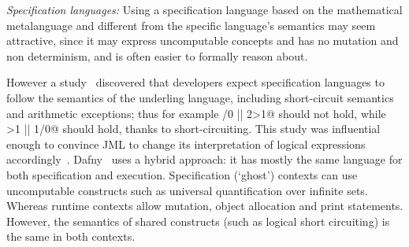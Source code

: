 


\textit{Specification languages:}
Using a specification language based on the mathematical metalanguage and different from the specific language's semantics may seem attractive, since it may express uncomputable concepts and has no mutation and non determinism, and is often easier to formally reason about.

However a study~\cite{chalin2007logical} discovered that developers expect specification languages to follow the semantics of the underling language, including short-circuit semantics and arithmetic exceptions; thus for example /0 || 2>1@ should not hold, while >1 || 1/0@ should hold, thanks to short-circuiting.
This study was influential enough to convince JML to change its interpretation of logical expressions
accordingly~\cite{chalin2008jml}.
Dafny~\cite{?} uses a hybrid approach: it has mostly the same language for both specification and execution. Specification (`ghost') contexts can use uncomputable constructs such as universal quantification over infinite sets. Whereas runtime contexts allow mutation, object allocation and print statements. However, the semantics of shared constructs (such as logical short circuiting) is the same in both contexts.

